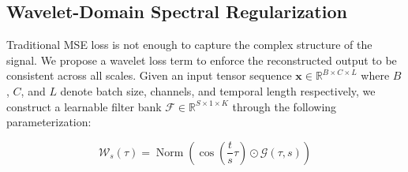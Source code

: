 \documentclass[conference]{IEEEtran}
\begin{document}







\subsection{Wavelet-Domain Spectral Regularization}
\label{subsec:wavelet}

Traditional MSE loss  is not enough to capture the complex structure of the signal. We propose a wavelet loss term to enforce the reconstructed output to be consistent across all scales. Given an input tensor sequence $\mathbf{x} \in \mathbb{R}^{B \times C \times L}$ where $B$, $C$, and $L$ denote batch size, channels, and temporal length respectively, we construct a learnable filter bank $\mathcal{F} \in \mathbb{R}^{S \times 1 \times K}$ through the following parameterization:

\begin{equation}
    \label{eq:wavelet}
    \mathcal{W}_s(\tau) = \operatorname{Norm} \left(\cos\left(\frac{t}{s}\tau\right) \odot \mathcal{G}(\tau,s)\right)
\end{equation}
\end{document}
